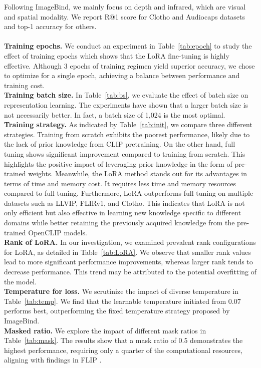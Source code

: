 \documentclass{article} \usepackage{iclr2024_conference,times}
\begin{document}
\begin{table*}[h]
\end{table*}


Following ImageBind, we mainly focus on depth and infrared, which are visual and spatial modality. We report R@1 score for Clotho and Audiocaps datasets and top-1 accuracy for others.\\ \\
\textbf{Training epochs.} We conduct an experiment in Table~\ref{tab:epoch} to study the effect of training epochs which shows that the LoRA fine-tuning is highly effective. Although 3 epochs of training regimen yield superior accuracy, we chose to optimize for a single epoch, achieving a balance between performance and training cost.\\
\textbf{Training batch size.} In Table~\ref{tab:bs}, we evaluate the effect of batch size on representation learning. The experiments have shown that a larger batch size is not necessarily better. In fact, a batch size of 1,024 is the most optimal.\\
\textbf{Training strategy.} As indicated by Table~\ref{tab:init}, we compare three different strategies. Training from scratch exhibits the poorest performance, likely due to the lack of prior knowledge from CLIP pretraining. On the other hand, full tuning shows significant improvement compared to training from scratch. This highlights the positive impact of leveraging prior knowledge in the form of pre-trained weights. Meanwhile, the LoRA method stands out for its advantages in terms of time and memory cost. It requires less time and memory resources compared to full tuning. Furthermore, LoRA outperforms full tuning on multiple datasets such as LLVIP, FLIRv1, and Clotho. This indicates that LoRA is not only efficient but also effective in learning new knowledge specific to different domains while better retaining the previously acquired knowledge from the pre-trained OpenCLIP models.\\
\textbf{Rank of LoRA.} In our investigation, we examined prevalent rank configurations for LoRA, as detailed in Table~\ref{tab:LoRA}. We observe that smaller rank values lead to more significant performance improvements, whereas larger rank tends to decrease performance. This trend may be attributed to the potential overfitting of the model.\\
\textbf{Temperature for loss.} We scrutinize the impact of diverse temperature in Table~\ref{tab:temp}. We find that the learnable temperature initiated from 0.07 performs best, outperforming the fixed temperature strategy proposed by ImageBind.\\
\textbf{Masked ratio.} We explore the impact of different mask ratios in Table~\ref{tab:mask}. The results show that a mask ratio of 0.5 demonstrates the highest performance, requiring only a quarter of the computational resources, aligning with findings in FLIP \citep{li2023scaling}.
\end{document}
